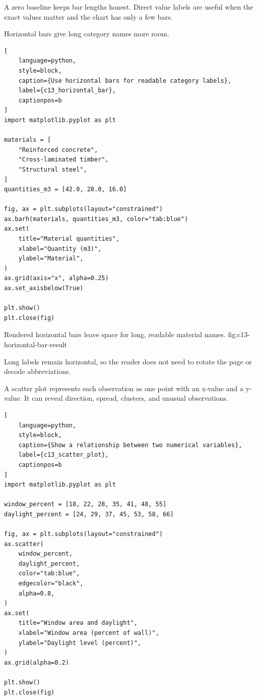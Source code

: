 A zero baseline keeps bar lengths honest. Direct value labels are useful when
the exact values matter and the chart has only a few bars.


Horizontal bars give long category names more room.

\begin{lstlisting}[
    language=python,
    style=block,
    caption={Use horizontal bars for readable category labels},
    label={c13_horizontal_bar},
    captionpos=b
]
import matplotlib.pyplot as plt

materials = [
    "Reinforced concrete",
    "Cross-laminated timber",
    "Structural steel",
]
quantities_m3 = [42.0, 28.0, 16.0]

fig, ax = plt.subplots(layout="constrained")
ax.barh(materials, quantities_m3, color="tab:blue")
ax.set(
    title="Material quantities",
    xlabel="Quantity (m3)",
    ylabel="Material",
)
ax.grid(axis="x", alpha=0.25)
ax.set_axisbelow(True)

plt.show()
plt.close(fig)
\end{lstlisting}

{Rendered horizontal bars leave space for long, readable material names.}
{fig:c13-horizontal-bar-result}

Long labels remain horizontal, so the reader does not need to rotate the page
or decode abbreviations.


A scatter plot represents each observation as one point with an x-value and a
y-value. It can reveal direction, spread, clusters, and unusual observations.

\begin{lstlisting}[
    language=python,
    style=block,
    caption={Show a relationship between two numerical variables},
    label={c13_scatter_plot},
    captionpos=b
]
import matplotlib.pyplot as plt

window_percent = [18, 22, 28, 35, 41, 48, 55]
daylight_percent = [24, 29, 37, 45, 53, 58, 66]

fig, ax = plt.subplots(layout="constrained")
ax.scatter(
    window_percent,
    daylight_percent,
    color="tab:blue",
    edgecolor="black",
    alpha=0.8,
)
ax.set(
    title="Window area and daylight",
    xlabel="Window area (percent of wall)",
    ylabel="Daylight level (percent)",
)
ax.grid(alpha=0.2)

plt.show()
plt.close(fig)
\end{lstlisting}

